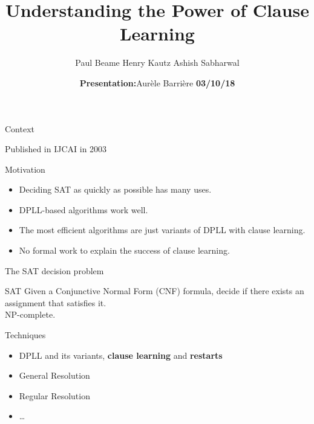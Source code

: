 \documentclass[page number]{beamer}
\def\outline{
  \begin{frame}[plain,noframenumbering]
    \frametitle{Outline}
    \tableofcontents[currentsection]
  \end{frame}
}
\begin{document}
\title[The Power of Clause Learning]{Understanding the Power of Clause Learning}

\author{Paul Beame \hfill Henry Kautz \hfill Ashish Sabharwal}
\vfill
\date{
  \vfill
  \textbf{Presentation:}\quad Aur\`ele Barri\`ere
  \vfill
  \textbf{03/10/18}}

\def\outline{
  \begin{frame}[plain,noframenumbering]
    \frametitle{Outline}
    \tableofcontents[currentsection]
  \end{frame}
}

\begin{frame}
  \vspace{-2cm}
  \maketitle
  \vspace{-4cm}
\end{frame}



\begin{frame}{Context}
  \begin{block}{Published in IJCAI in 2003}
  \end{block}
  \vfill
  \begin{block}{Motivation}
    \begin{itemize}
    \item Deciding SAT as quickly as possible has many uses.
    \item DPLL-based algorithms work well.
    \item The most efficient algorithms are just variants of DPLL with clause learning.
    \item No formal work to explain the success of clause learning.
    \end{itemize}
  \end{block}
\end{frame}

\begin{frame}{The SAT decision problem}
  \begin{block}{SAT}
    Given a Conjunctive Normal Form (CNF) formula, decide if there exists an assignment that satisfies it. \\
    NP-complete.
  \end{block}
  \vfill
  \begin{exampleblock}{Techniques}
    \begin{itemize}
    \item DPLL and its variants, \textbf{clause learning} and \textbf{restarts}
    \item General Resolution
    \item Regular Resolution
    \item \dots
    \end{itemize}
  \end{exampleblock}
\end{frame}
\end{document}

